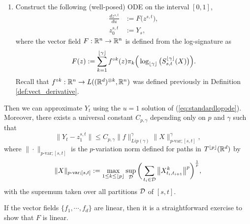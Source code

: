 \begin{theorem}
\begin{enumerate}
\item Construct the following (well-posed) ODE on the interval $[0,1]$,
\begin{align}
\frac{dz^{s,t}}{du} & := F\big(z^{s,t}\big),\label{eq:standardlogode}\\
z_0^{s,t} & := Y_s,\nonumber
\end{align}
where the vector field $F:\mathbb{R}^n\rightarrow\mathbb{R}^n$ is defined from the log-signature as
\begin{equation}
F(z) := \sum_{k=1}^{\lfloor \gamma \rfloor}f^{\circ k}(z)\pi_k\Big(\log_{\lfloor \gamma \rfloor}\big(S_{s,t}^{\lfloor \gamma \rfloor}(X)\big)\Big).
\label{eq:logodevectfield}
\end{equation}
Recall that $f^{\circ k} : \mathbb{R}^n\rightarrow L((\mathbb{R}^d)^{\otimes k}, \mathbb{R}^n)$ was defined previously in Definition \ref{def:vect_derivative}.
\end{enumerate}
Then we can approximate $Y_t$ using the $u = 1$ solution of (\ref{eq:standardlogode}). Moreover, there exists a universal constant $C_{p,\gamma}$ depending only on $p$ and $\gamma$ such that 
\begin{equation}
\big\|Y_t - z_1^{s,t}\big\| \leq C_{p,\gamma}\|f\|_{Lip(\gamma)}^\gamma\|X\|_{p\text{-var};[s,t]}^\gamma,
\label{eq:local_logodeestimate}
\end{equation}
where $\|\cdot\|_{p\text{-var};[s,t]}$ is the $p$-variation norm defined for paths in $T^{\lfloor p \rfloor}(\mathbb{R}^d)$ by
\begin{equation}
\|X\|_{p\text{-var};[s,t]} := \max_{1\leq k\leq \lfloor p \rfloor}\sup_{\mathcal{D}}\bigg(\sum_{t_i\in\mathcal{D}}\big\|X_{t_i, t_{i+1}}^k\big\|^p\bigg)^\frac{1}{p},
\label{eq:rpnorm}
\end{equation}
with the supremum taken over all partitions $\mathcal{D}$ of $[s,t]$.
\end{theorem}\medbreak
\begin{remark}
If the vector fields $\{f_1, \cdots, f_d\}$ are linear, then it is a straightforward exercise to show that $F$ is linear.
\end{remark}


